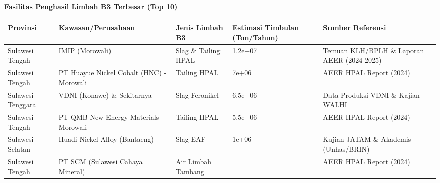 \documentclass[
]{article}
\newcounter{none} %
\begin{document}
\paragraph{Fasilitas Penghasil Limbah B3 Terbesar (Top
10)}\label{fasilitas-penghasil-limbah-b3-terbesar-top-10}

{\def\LTcaptype{none} %
\begin{longtable}[]{@{}
  >{\raggedright\arraybackslash}p{}
  >{\raggedright\arraybackslash}p{}
  >{\raggedright\arraybackslash}p{}
  >{\raggedleft\arraybackslash}p{}
  >{\raggedright\arraybackslash}p{}@{}}
\toprule\noalign{}
\begin{minipage}[b]{\linewidth}\raggedright
Provinsi
\end{minipage} & \begin{minipage}[b]{\linewidth}\raggedright
Kawasan/Perusahaan
\end{minipage} & \begin{minipage}[b]{\linewidth}\raggedright
Jenis Limbah B3
\end{minipage} & \begin{minipage}[b]{\linewidth}\raggedleft
Estimasi Timbulan (Ton/Tahun)
\end{minipage} & \begin{minipage}[b]{\linewidth}\raggedright
Sumber Referensi
\end{minipage} \\
\midrule\noalign{}
\endhead
\bottomrule\noalign{}
\endlastfoot
Sulawesi Tengah & IMIP (Morowali) & Slag \& Tailing HPAL & 1.2e+07 &
Temuan KLH/BPLH \& Laporan AEER (2024-2025) \\
Sulawesi Tengah & PT Huayue Nickel Cobalt (HNC) - Morowali & Tailing
HPAL & 7e+06 & AEER HPAL Report (2024) \\
Sulawesi Tenggara & VDNI (Konawe) \& Sekitarnya & Slag Feronikel &
6.5e+06 & Data Produksi VDNI \& Kajian WALHI \\
Sulawesi Tengah & PT QMB New Energy Materials - Morowali & Tailing HPAL
& 5.5e+06 & AEER HPAL Report (2024) \\
Sulawesi Selatan & Huadi Nickel Alloy (Bantaeng) & Slag EAF & 1e+06 &
Kajian JATAM \& Akademis (Unhas/BRIN) \\
Sulawesi Tengah & PT SCM (Sulawesi Cahaya Mineral) & Air Limbah Tambang
& 800000 & AEER HPAL Report (2024) \\
\end{longtable}
}
\end{document}
